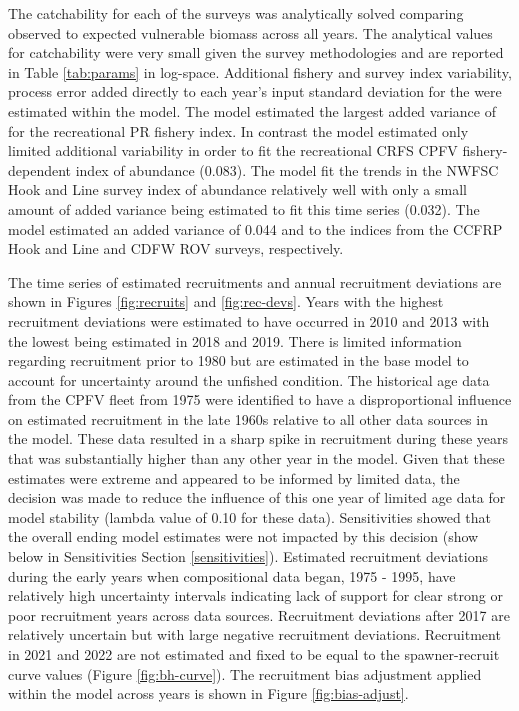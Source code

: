 \documentclass[11pt,
  english,
  letterpaper,
]{article}
\begin{document}
The catchability for each of the surveys was analytically solved comparing observed to expected vulnerable biomass across all years. The analytical values for catchability were very small given the survey methodologies and are reported in Table \ref{tab:params} in log-space. Additional fishery and survey index variability, process error added directly to each year's input standard deviation for the were estimated within the model. The model estimated the largest added variance of for the recreational PR fishery index. In contrast the model estimated only limited additional variability in order to fit the recreational CRFS CPFV fishery-dependent index of abundance (0.083). The model fit the trends in the NWFSC Hook and Line survey index of abundance relatively well with only a small amount of added variance being estimated to fit this time series (0.032). The model estimated an added variance of 0.044 and to the indices from the CCFRP Hook and Line and CDFW ROV surveys, respectively.

The time series of estimated recruitments and annual recruitment deviations are shown in Figures \ref{fig:recruits} and \ref{fig:rec-devs}. Years with the highest recruitment deviations were estimated to have occurred in 2010 and 2013 with the lowest being estimated in 2018 and 2019. There is limited information regarding recruitment prior to 1980 but are estimated in the base model to account for uncertainty around the unfished condition. The historical age data from the CPFV fleet from 1975 were identified to have a disproportional influence on estimated recruitment in the late 1960s relative to all other data sources in the model. These data resulted in a sharp spike in recruitment during these years that was substantially higher than any other year in the model. Given that these estimates were extreme and appeared to be informed by limited data, the decision was made to reduce the influence of this one year of limited age data for model stability (lambda value of 0.10 for these data). Sensitivities showed that the overall ending model estimates were not impacted by this decision (show below in Sensitivities Section \ref{sensitivities}). Estimated recruitment deviations during the early years when compositional data began, 1975 - 1995, have relatively high uncertainty intervals indicating lack of support for clear strong or poor recruitment years across data sources. Recruitment deviations after 2017 are relatively uncertain but with large negative recruitment deviations. Recruitment in 2021 and 2022 are not estimated and fixed to be equal to the spawner-recruit curve values (Figure \ref{fig:bh-curve}). The recruitment bias adjustment applied within the model across years is shown in Figure \ref{fig:bias-adjust}.
\end{document}
